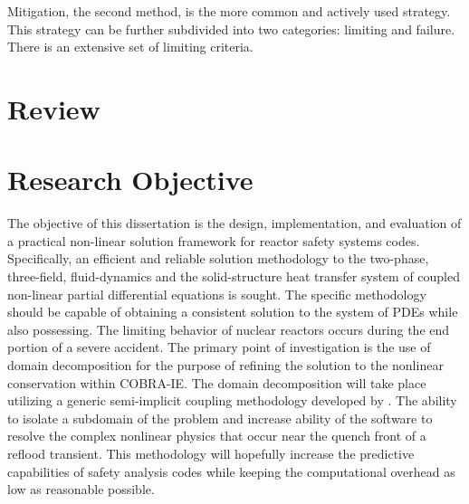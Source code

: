 Mitigation, the second method, is the more common and actively used strategy.
This strategy can be further subdivided into two categories: limiting and failure.
There is an extensive set of limiting criteria.

\section{Review}
\label{sect:review}

\section{Research Objective}
The objective of this dissertation is the design, implementation, and evaluation of a practical non-linear solution framework for reactor safety systems codes.
Specifically, an efficient and reliable solution methodology to the two-phase, three-field, fluid-dynamics and the solid-structure heat transfer system of coupled non-linear partial differential equations is sought.
The specific methodology should be capable of obtaining a consistent solution to the system of PDEs while also possessing. \cite{Aktas1996}
The limiting behavior of nuclear reactors occurs during the end portion of a severe accident.
The primary point of investigation is the use of domain decomposition for the purpose of refining the solution to the nonlinear conservation within COBRA-IE.
The domain decomposition will take place utilizing a generic semi-implicit coupling methodology developed by \citet{Weaver2002}.
The ability to isolate a subdomain of the problem and increase ability of the software to resolve the complex nonlinear physics that occur near the quench front of a reflood transient.
This methodology will hopefully increase the predictive capabilities of safety analysis codes while keeping the computational overhead as low as reasonable possible.